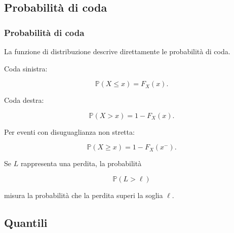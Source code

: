 \documentclass[handout]{beamer}%
\providecommand{\Prob}{\mathbb{P}}
\providecommand{\1}{\mathbf{1}}
\providecommand{\QTR}[2]{\csname #1\endcsname{#2}}
\begin{document}


\subsection{Probabilit\`{a} di coda}%

\begin{frame}%
%

\frametitle{Probabilit\`{a} di coda}%


La funzione di distribuzione descrive direttamente le probabilit\`{a} di coda.

\medskip

Coda sinistra:%

\[
\Prob(X\leq x)=F_{X}(x).
\]


\medskip

Coda destra:%

\[
\Prob(X>x)=1-F_{X}(x).
\]


\medskip

Per eventi con disuguaglianza non stretta:%

\[
\Prob(X\geq x)=1-F_{X}(x^{-}).
\]


\medskip

Se $L$ rappresenta una perdita, la probabilit\`{a}%

\[
\Prob(L>\ell)
\]


misura la probabilit\`{a} che la perdita superi la soglia $\ell$.%

\transboxout
\end{frame}%




\subsection{Quantili}%
\end{document}
